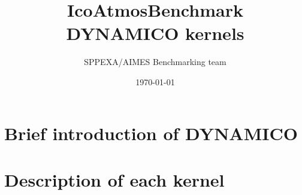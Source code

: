 \documentclass[a4paper,twoside,openright]{report}
\title{{{\Large IcoAtmosBenchmark \\ DYNAMICO kernels} }}
\author{{{SPPEXA/AIMES Benchmarking team}}}
\date{\today}
\begin{document}
\maketitle
\tableofcontents

\cleardoublepage

\chapter{Brief introduction of DYNAMICO} \label{chap:introdynamico}

\clearpage

\chapter{Description of each kernel} \label{chap:kerneldynamico}










\appendix


\cleardoublepage


\end{document}
